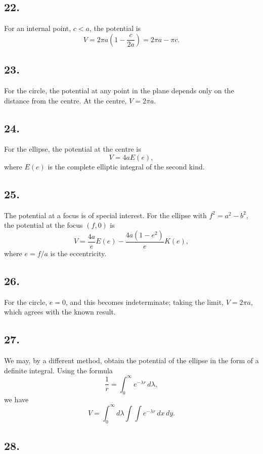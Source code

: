 \documentclass[11pt,a4paper]{book}
\begin{document}
\subsection*{22.}

For an internal point, $c<a$, the potential is
\[
V = 2\pi a\left(1-\frac{c}{2a}\right) = 2\pi a - \pi c.
\]

\subsection*{23.}

For the circle, the potential at any point in the plane depends only on the
distance from the centre. At the centre, $V=2\pi a$.

\subsection*{24.}

For the ellipse, the potential at the centre is
\[
V = 4aE(e),
\]
where $E(e)$ is the complete elliptic integral of the second kind.

\newpage
\subsection*{25.}

The potential at a focus is of special interest. For the ellipse with
$f^2=a^2-b^2$, the potential at the focus $(f,0)$ is
\[
V = \frac{4a}{e}E(e) - \frac{4a(1-e^2)}{e}K(e),
\]
where $e=f/a$ is the eccentricity.

\subsection*{26.}

For the circle, $e=0$, and this becomes indeterminate; taking the limit,
$V=2\pi a$, which agrees with the known result.

\subsection*{27.}

We may, by a different method, obtain the potential of the ellipse in the
form of a definite integral. Using the formula
\[
\frac{1}{r} = \int_0^{\infty} e^{-\lambda r}\,d\lambda,
\]
we have
\[
V = \int_0^{\infty} d\lambda \int\!\!\!\int e^{-\lambda r}\,dx\,dy.
\]

\subsection*{28.}
\end{document}
